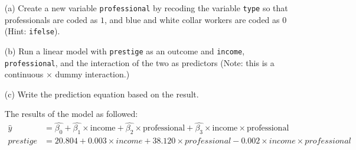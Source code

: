 \documentclass[12pt,letterpaper]{article}
\begin{document}
\newpage
\begin{enumerate}
	
	\item [(a)]
	Create a new variable \texttt{professional} by recoding the variable \texttt{type} so that professionals are coded as $1$, and blue and white collar workers are coded as $0$ (Hint: \texttt{ifelse}).
	
	\vspace{.15cm}
	
						
	
	\item [(b)]
	Run a linear model with \texttt{prestige} as an outcome and \texttt{income}, \texttt{professional}, and the interaction of the two as predictors (Note: this is a continuous $\times$ dummy interaction.)
	
	\vspace{.15cm}
	
							

	\item [(c)]
	Write the prediction equation based on the result.
	
	 \noindent The results of the model as followed: %
	 \begin{align*}
	 	\hat{y} &= \hat{\beta_0} + \hat{\beta_1} \times  \text{income} +  \hat{\beta_2} \times  \text{professional} +  \hat{\beta_3} \times  \text{income} \times \text{professional}\\
	 	prestige &= 20.804 + 0.003 \times {income} + 38.120 \times {professional} - 0.002 \times {income} \times{professional}
	 \end{align*}
	 

\end{enumerate}
\end{document}
